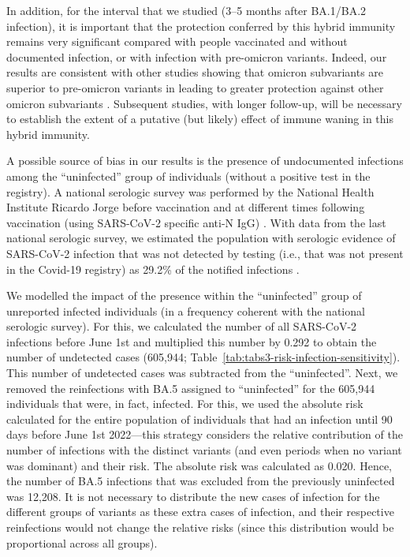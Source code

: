 In addition, for the interval that we studied (3--5 months after BA.1/BA.2 infection), it is important that the protection conferred by this hybrid immunity remains very significant compared with people vaccinated and without documented infection, or with infection with pre-omicron variants. Indeed, our results are consistent with other studies showing that omicron subvariants are superior to pre-omicron variants in leading to greater protection against other omicron subvariants \citep{altarawneh2022ProtectionSARSCoV2, ayoub2022EstimatingProtection, forecastingteam2022SARSCoV2Infection, chemaitelly2022ProtectionOmicron}. Subsequent studies, with longer follow-up, will be necessary to establish the extent of a putative (but likely) effect of immune waning in this hybrid immunity.

A possible source of bias in our results is the presence of undocumented infections among the ``uninfected'' group of individuals (without a positive test in the registry). A national serologic survey was performed by the National Health Institute Ricardo Jorge before vaccination and at different times following vaccination (using SARS-CoV-2 specific anti-N IgG) \citep{institutonacionaldesaudedoutorricardojorge2021NationalCOVID19}. With data from the last national serologic survey, we estimated the population with serologic evidence of SARS-CoV-2 infection that was not detected by testing (i.e., that was not present in the Covid-19 registry) as 29.2\% of the notified infections \citep{institutonacionaldesaudedoutorricardojorge2021NationalCOVID19}.

We modelled the impact of the presence within the ``uninfected'' group of unreported infected individuals (in a frequency coherent with the national serologic survey). For this, we calculated the number of all SARS-CoV-2 infections before June 1st and multiplied this number by 0.292 to obtain the number of undetected cases (605,944; Table~\ref{tab:tabs3-risk-infection-sensitivity}). This number of undetected cases was subtracted from the ``uninfected''. Next, we removed the reinfections with BA.5 assigned to ``uninfected'' for the 605,944 individuals that were, in fact, infected. For this, we used the absolute risk calculated for the entire population of individuals that had an infection until 90 days before June 1st 2022---this strategy considers the relative contribution of the number of infections with the distinct variants (and even periods when no variant was dominant) and their risk. The absolute risk was calculated as 0.020. Hence, the number of BA.5 infections that was excluded from the previously uninfected was 12,208. It is not necessary to distribute the new cases of infection for the different groups of variants as these extra cases of infection, and their respective reinfections would not change the relative risks (since this distribution would be proportional across all groups).

